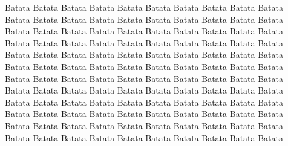 \begin{flushright}
    Batata Batata Batata Batata Batata Batata Batata Batata Batata Batata Batata Batata 
    Batata Batata Batata Batata Batata Batata Batata Batata Batata Batata Batata Batata 
    Batata Batata Batata Batata Batata Batata Batata Batata Batata Batata Batata Batata 
    Batata Batata Batata Batata Batata Batata Batata Batata Batata Batata Batata Batata 
    Batata Batata Batata Batata Batata Batata Batata Batata Batata Batata Batata Batata 
    Batata Batata Batata Batata Batata Batata Batata Batata Batata Batata Batata Batata 
    Batata Batata Batata Batata Batata Batata Batata Batata Batata Batata Batata Batata 
    Batata Batata Batata Batata Batata Batata Batata Batata Batata Batata Batata Batata 
    Batata Batata Batata Batata Batata Batata Batata Batata Batata Batata Batata Batata 
    Batata Batata Batata Batata Batata Batata Batata Batata Batata Batata Batata Batata 
    
\end{flushright}